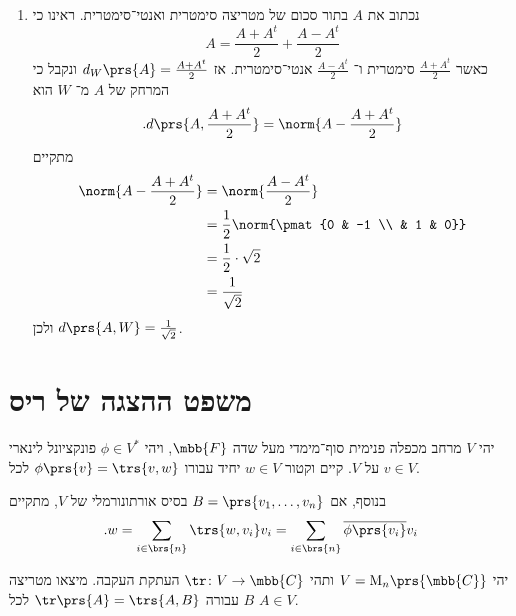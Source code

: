 \documentclass[a4paper,10pt,twoside,openany]{book}
\renewcommand{\Mat}{\mathrm{M}}
\begin{document}
\begin{solution}
\begin{enumerate}
אכן,
\begin{align*}
P_W\prs{A} &= \sum_{i \in [3]} \trs{A, v_i} v_i \\&= \trs{A, E_{1,1}} E_{1,1} + \trs{A, \frac{1}{\sqrt{2}} \prs{E_{1,2} + E_{2,1}}} \cdot \frac{1}{\sqrt{2}} \prs{E_{1,2} + E_{2,1}} + \trs{A, E_{2,2}}, E_{2,2}
\\&=
a_{1,1} E_{1,1} + \frac{1}{2} \prs{a_{1,2} + a_{2,1}} \prs{E_{1,2} + E_{2,1}} + a_{2,2} E_{2,2}
\\&=
\pmat{a_{1,1} & \frac{a_{1,2} + a_{2,1}}{2} \\ \frac{a_{1,2} + a_{2,1}}{2} & a_{2,2}}
\\ \text{.} \hphantom{P_W\prs{A}} &=
\frac{A + A^t}{2}
\end{align*}

\item
נכתוב את
$A$
בתור סכום של מטריצה סימטרית ואנטי־סימטרית. ראינו כי
\[A = \frac{A + A^t}{2} + \frac{A - A^t}{2}\]
כאשר
$\frac{A + A^t}{2}$
סימטרית ו־%
$\frac{A - A^t}{2}$
אנטי־סימטרית.
אז
$d_W\prs{A} = \frac{A+A^t}{2}$
ונקבל כי
המרחק של
$A$
מ־%
$W$
הוא
\[\text{.} d\prs{A, \frac{A + A^t}{2}} = \norm{A - \frac{A + A^t}{2}}\]
מתקיים
\begin{align*}
\norm{A - \frac{A + A^t}{2}} &= \norm{\frac{A - A^t}{2}}
\\&= \frac{1}{2} \norm{\pmat{0 & -1 \\ & 1 & 0}}
\\&= \frac{1}{2} \cdot \sqrt{2}
\\&= \frac{1}{\sqrt{2}}
\end{align*}
ולכן
$d\prs{A, W} = \frac{1}{\sqrt{2}}$.
\end{enumerate}
\end{solution}

\section{משפט ההצגה של ריס}

\begin{theorem}
יהי
$V$
מרחב מכפלה פנימית סוף־מימדי מעל שדה
$\mbb{F}$,
ויהי
$\phi \in V^*$
פונקציונל לינארי על
$V$.
קיים וקטור
$w \in V$
יחיד עבורו
$\phi\prs{v} = \trs{v,w}$
לכל
$v \in V$.

בנוסף, אם
$B = \prs{v_1, \ldots, v_n}$
בסיס אורתונורמלי של
$V$,
מתקיים
\[\text{.} w = \sum_{i \in \brs{n}} \trs{w, v_i} v_i = \sum_{i \in \brs{n}} \overline{\phi\prs{v_i}} v_i\]
\end{theorem}

\begin{exercisechap}
יהי
$V = \Mat_n\prs{\mbb{C}}$
ותהי
$\tr \colon V \to \mbb{C}$
העתקת העקבה.
מיצאו מטריצה
$B$
עבורה
$\tr\prs{A} = \trs{A,B}$
לכל
$A \in V$.
\end{exercisechap}
\end{document}
